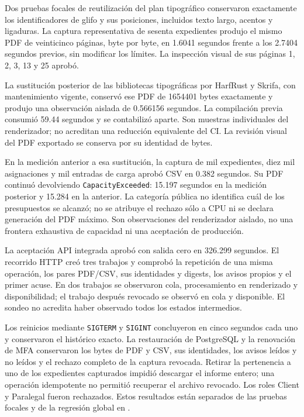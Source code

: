 Dos pruebas focales de reutilización del plan tipográfico conservaron exactamente
los identificadores de glifo y sus posiciones, incluidos texto largo, acentos y
ligaduras. La captura representativa de sesenta expedientes produjo el mismo PDF
de veinticinco páginas, byte por byte, en 1.6041 segundos frente a los 2.7404
segundos previos, sin modificar los límites. La inspección visual de sus páginas
1, 2, 3, 13 y 25 aprobó.

La sustitución posterior de las bibliotecas tipográficas por HarfRust y Skrifa,
con mantenimiento vigente, conservó ese PDF de 1654401 bytes exactamente y
produjo una observación aislada de 0.566156 segundos. La compilación previa
consumió 59.44 segundos y se contabilizó aparte. Son muestras individuales del
renderizador; no acreditan una reducción equivalente del CI. La revisión visual
del PDF exportado se conserva por su identidad de bytes.

En la medición anterior a esa sustitución, la captura de mil expedientes,
diez mil asignaciones y mil entradas de carga aprobó CSV en 0.382 segundos. Su PDF continuó devolviendo
\texttt{CapacityExceeded}: 15.197 segundos en la medición posterior y 15.284 en
la anterior. La categoría pública no identifica cuál de los presupuestos se
alcanzó; no se atribuye el rechazo sólo a CPU ni se declara generación del PDF
máximo. Son observaciones del renderizador aislado, no una frontera exhaustiva
de capacidad ni una aceptación de producción.

La aceptación API integrada aprobó con salida cero en 326.299 segundos. El
recorrido HTTP creó tres trabajos y comprobó la repetición de una misma
operación, los pares PDF/CSV, sus identidades y digests, los avisos propios y el
primer acuse. En dos trabajos se observaron cola, procesamiento en renderizado
y disponibilidad; el trabajo después revocado se observó en cola y disponible.
El sondeo no acredita haber observado todos los estados intermedios.

Los reinicios mediante \texttt{SIGTERM} y \texttt{SIGINT} concluyeron en cinco
segundos cada uno y conservaron el histórico exacto. La restauración de
PostgreSQL y la renovación de MFA conservaron los bytes de PDF y CSV, sus
identidades, los avisos leídos y no leídos y el rechazo completo de la captura
revocada. Retirar la pertenencia a uno de los expedientes capturados impidió
descargar el informe entero; una operación idempotente no permitió recuperar
el archivo revocado. Los roles Client y Paralegal fueron rechazados.
Estos resultados están separados de las pruebas focales y de la regresión
global en .


